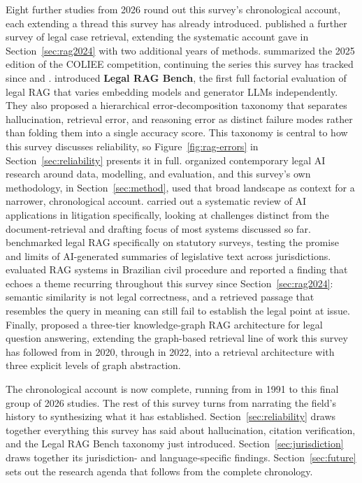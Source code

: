 Eight further studies from 2026 round out this survey's chronological account, each extending a
thread this survey has already introduced. \citet{yang2026} published a further survey of legal
case retrieval, extending the systematic account \citet{feng2024} gave in
Section~\ref{sec:rag2024} with two additional years of methods. \citet{goebel2026} summarized the
2025 edition of the COLIEE competition, continuing the series this survey has tracked since
\citet{goebel2023} and \citet{goebel2024}. \citet{butler2026} introduced \textbf{Legal RAG Bench},
the first full factorial evaluation of legal RAG that varies embedding models and generator LLMs
independently. They also proposed a hierarchical error-decomposition taxonomy that separates
hallucination, retrieval error, and reasoning error as distinct failure modes rather than folding
them into a single accuracy score. This taxonomy is central to how this survey discusses
reliability, so Figure~\ref{fig:rag-errors} in Section~\ref{sec:reliability} presents it in full.
\citet{chi2026} organized contemporary legal AI research around data, modelling, and evaluation,
and this survey's own methodology, in Section~\ref{sec:method}, used that broad landscape as
context for a narrower, chronological account. \citet{zhao2026} carried out a systematic review of
AI applications in litigation specifically, looking at challenges distinct from the
document-retrieval and drafting focus of most systems discussed so far. \citet{afane2026}
benchmarked legal RAG specifically on statutory surveys, testing the promise and limits of
AI-generated summaries of legislative text across jurisdictions. \citet{silva2026} evaluated RAG
systems in Brazilian civil procedure and reported a finding that echoes a theme recurring throughout
this survey since Section~\ref{sec:rag2024}: semantic similarity is not legal correctness, and a
retrieved passage that resembles the query in meaning can still fail to establish the legal point at
issue. Finally, \citet{le2026} proposed a three-tier knowledge-graph RAG architecture for legal
question answering, extending the graph-based retrieval line of work this survey has followed from
\citet{sovrano2020} in 2020, through \citet{zhu2022} in 2022, into a retrieval architecture with
three explicit levels of graph abstraction.

The chronological account is now complete, running from \citet{ashley1991} in 1991 to this final
group of 2026 studies. The rest of this survey turns from narrating the field's history to
synthesizing what it has established. Section~\ref{sec:reliability} draws together everything this
survey has said about hallucination, citation verification, and the Legal RAG Bench taxonomy just
introduced. Section~\ref{sec:jurisdiction} draws together its jurisdiction- and language-specific
findings. Section~\ref{sec:future} sets out the research agenda that follows from the complete
chronology.
